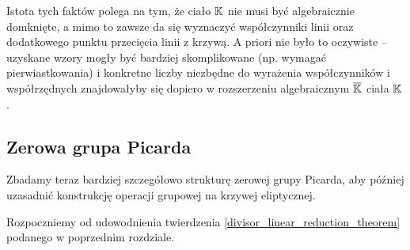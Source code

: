 Istota tych faktów polega na tym,
że ciało $\mathbb{K}$ nie musi być algebraicznie domknięte,
a mimo to zawsze da się wyznaczyć współczynniki linii
oraz dodatkowego punktu przecięcia linii z krzywą.
A priori nie było to oczywiste --
uzyskane wzory mogły być bardziej skomplikowane (np. wymagać pierwiastkowania)
i konkretne liczby niezbędne do wyrażenia współczynników i współrzędnych
znajdowałyby się dopiero w rozszerzeniu algebraicznym $\overline{\mathbb{K}}$
ciała $\mathbb{K}$.

\subsection*{Zerowa grupa Picarda}

Zbadamy teraz bardziej szczegółowo
strukturę zerowej grupy Picarda,
aby później uzasadnić
konstrukcję operacji grupowej na krzywej eliptycznej.

Rozpoczniemy od udowodnienia twierdzenia
\ref{divisor_linear_reduction_theorem}
podanego w poprzednim rozdziale.

